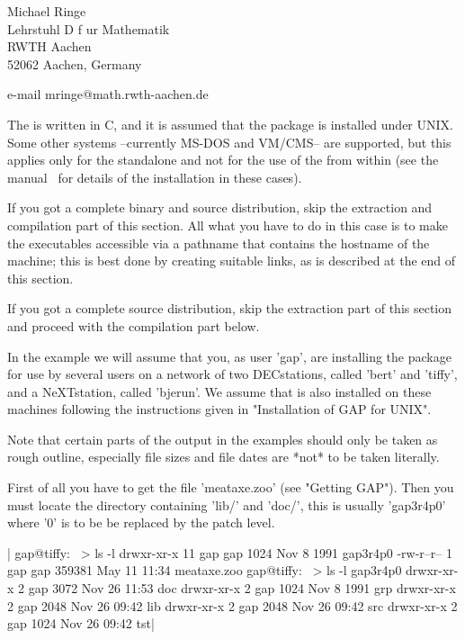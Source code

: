 Michael Ringe\\
Lehrstuhl D f{ u}r Mathematik\\
RWTH Aachen\\
52062 Aachen, Germany

e-mail mringe@math.rwth-aachen.de


The {\MeatAxe} is written in C, and it is assumed that the package is
installed  under UNIX.  Some other systems --currently MS-DOS and VM/CMS--
are supported, but this applies only for the standalone and not for the
use of the {\MeatAxe} from within {\GAP} (see the {\MeatAxe}
manual~\cite{Rin93} for details of the installation in these cases).

If you got  a complete binary and  source distribution, skip the extraction
and compilation part of this section.  All what you have to do in this case
is to make the executables accessible via a pathname that contains the
hostname of the machine; this is best done by creating suitable links, as
is described at the end of this section.

If you  got a complete source distribution,  skip the  extraction part of
this section and proceed with the compilation part below.

In the example we will assume that you, as user 'gap', are installing the
{\MeatAxe} package for use by several users on a network of two DECstations,
called 'bert' and 'tiffy', and a NeXTstation, called 'bjerun'. We  assume
that  {\GAP}  is  also   installed  on  these   machines  following   the
instructions given in "Installation of GAP for UNIX".

Note that certain parts  of  the  output  in the examples should  only be
taken as rough outline, especially file sizes and file dates are *not* to
be taken literally.

First of all you have to get the file 'meataxe.zoo' (see "Getting GAP").
Then you must locate the {\GAP} directory containing 'lib/' and 'doc/',
this is usually 'gap3r4p0' where '0' is to be be replaced by the patch
level.

|    gap@tiffy:~ > ls -l
    drwxr-xr-x  11 gap      gap          1024 Nov  8  1991 gap3r4p0
    -rw-r--r--   1 gap      gap        359381 May 11 11:34 meataxe.zoo
    gap@tiffy:~ > ls -l gap3r4p0
    drwxr-xr-x    2 gap          3072 Nov 26 11:53 doc
    drwxr-xr-x    2 gap          1024 Nov  8  1991 grp
    drwxr-xr-x    2 gap          2048 Nov 26 09:42 lib
    drwxr-xr-x    2 gap          2048 Nov 26 09:42 src
    drwxr-xr-x    2 gap          1024 Nov 26 09:42 tst|

